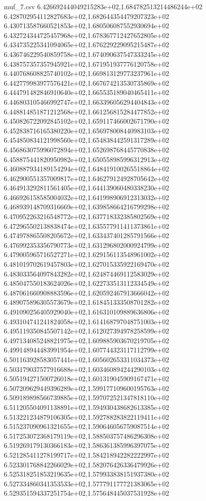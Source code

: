 \begin{filecontents*}{muf_7.csv}
6.426692444049215283e+02,1.684782513214486244e+02
6.428702954112827683e+02,1.682644354479207323e+02
6.430713587660521853e+02,1.680506087552930694e+02
6.432724344725457968e+02,1.678367712427652805e+02
6.434735225341094065e+02,1.676229229095215487e+02
6.436746229540859758e+02,1.674090637547333245e+02
6.438757357357945921e+02,1.671951937776120758e+02
6.440768608825740102e+02,1.669813129773237961e+02
6.442779983977576421e+02,1.667674213530735869e+02
6.444791482846910640e+02,1.665535189040465411e+02
6.446803105466992747e+02,1.663396056294404843e+02
6.448814851871212568e+02,1.661256815284477852e+02
6.450826722092845102e+02,1.659117466002671790e+02
6.452838716165380220e+02,1.656978008440983103e+02
6.454850834121998560e+02,1.654838442591317289e+02
6.456863075996072894e+02,1.652698768445770838e+02
6.458875441820950982e+02,1.650558985996312913e+02
6.460887934189154294e+02,1.648419100265518864e+02
6.462900551357009817e+02,1.646279124928705642e+02
6.464913292811561405e+02,1.644139060480338230e+02
6.466926158585004032e+02,1.641998906912313032e+02
6.468939148709316669e+02,1.639858664216799298e+02
6.470952263216548772e+02,1.637718332385802569e+02
6.472965502138838474e+02,1.635577911411373861e+02
6.474978865508205672e+02,1.633437401285791566e+02
6.476992353356790773e+02,1.631296802000924799e+02
6.479005965716527271e+02,1.629156113548961002e+02
6.481019702619457803e+02,1.627015335922169470e+02
6.483033564097843282e+02,1.624874469112583029e+02
6.485047550183624026e+02,1.622733513112334549e+02
6.487061660908883596e+02,1.620592467913666042e+02
6.489075896305573679e+02,1.618451333508701282e+02
6.491090256405929040e+02,1.616310109889636806e+02
6.493104741241824058e+02,1.614168797048751003e+02
6.495119350845507142e+02,1.612027394978258599e+02
6.497134085248821975e+02,1.609885903670219705e+02
6.499148944483991954e+02,1.607744323117112799e+02
6.501163928583057441e+02,1.605602653311034373e+02
6.503179037577916688e+02,1.603460894244290103e+02
6.505194271500726018e+02,1.601319045909167471e+02
6.507209629449396289e+02,1.599177109600195763e+02
6.509189898566739885e+02,1.597072521347818110e+02
6.511205504091138891e+02,1.594930438682613385e+02
6.513221234879106305e+02,1.592788283822119411e+02
6.515237090961321655e+02,1.590646056759087514e+02
6.517253072368179119e+02,1.588503757486296308e+02
6.519269179130366183e+02,1.586361385996397075e+02
6.521285411278199717e+02,1.584218942282222997e+02
6.523301768842266029e+02,1.582076426336479926e+02
6.525318251853219635e+02,1.579933838151937380e+02
6.527334860341353533e+02,1.577791177721383065e+02
6.529351594337251754e+02,1.575648445037531928e+02

\end{filecontents*}
